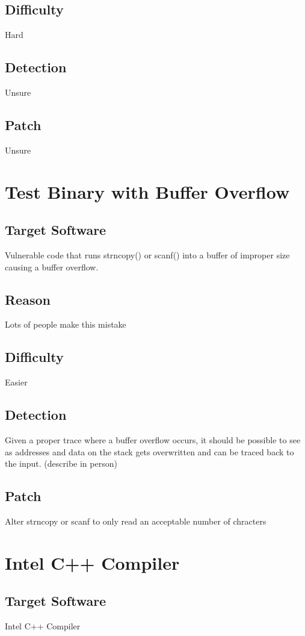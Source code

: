 \subsection{Difficulty}
Hard
\subsection{Detection}
Unsure
\subsection{Patch}
Unsure 




\section{Test Binary with Buffer Overflow}
\subsection{Target Software}
Vulnerable code that runs strncopy() or scanf() into a buffer of improper size causing a buffer overflow.
\subsection{Reason}
Lots of people make this mistake
\subsection{Difficulty}
Easier
\subsection{Detection}
Given a proper trace where a buffer overflow occurs, it should be possible to see as addresses and data on the stack gets overwritten and can be traced back to the input.  (describe in person)
\subsection{Patch}
Alter strncopy or scanf to only read an acceptable number of chracters

\section{Intel C++ Compiler}
\subsection{Target Software}
Intel C++ Compiler 
